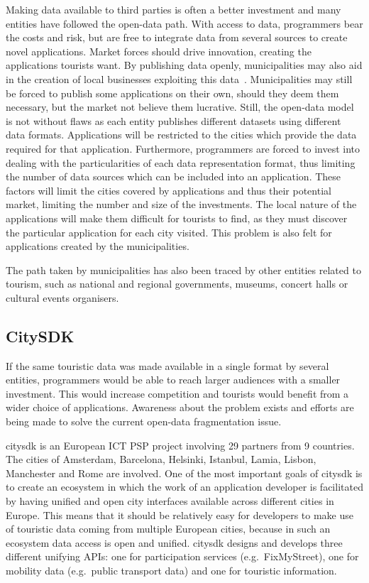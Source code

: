 \documentclass[times,doublespace]{ettauth}%
\begin{document}
Making data available to third parties is often a better investment and many entities have followed the open-data path.
With access to data, programmers bear the costs and risk, but are free to integrate data from several sources to create novel applications.
Market forces should drive innovation, creating the applications tourists want.
By publishing data openly, municipalities may also aid in the creation of local businesses exploiting this data~\cite{6525605}.
Municipalities may still be forced to publish some applications on their own, should they deem them necessary, but the market not believe them lucrative. 
Still, the open-data model is not without flaws as each entity publishes different datasets using different data formats.
Applications will be restricted to the cities which provide the data required for that application.
Furthermore, programmers are forced to invest into dealing with the particularities of each data representation format, thus limiting the number of data sources which can be included into an application.
These factors will limit the cities covered by applications and thus their potential market, limiting the number and size of the investments.
The local nature of the applications will make them difficult for tourists to find, as they must discover the particular application for each city visited.
This problem is also felt for applications created by the municipalities.

The path taken by municipalities has also been traced by other entities related to tourism, such as national and regional governments, museums, concert halls or cultural events organisers.

\subsection{CitySDK}
\label{s:citysdk}

If the same touristic data was made available in a single format by several entities, programmers would be able to reach larger audiences with a smaller investment. 
This would increase competition and tourists would benefit from a wider choice of applications.
Awareness about the problem exists and efforts are being made to solve the current open-data fragmentation issue.

\ac{citysdk} is an European ICT PSP project involving 29 partners from 9 countries.
The cities of Amsterdam, Barcelona, Helsinki, Istanbul, Lamia, Lisbon, Manchester and Rome are involved.
One of the most important goals of \ac{citysdk} is to create an ecosystem in which the work of an application developer is facilitated by having unified and open city interfaces available across different cities in Europe. 
This means that it should be relatively easy for developers to make use of touristic data coming from multiple European cities, because in such an ecosystem data access is open and unified. 
\ac{citysdk} designs and develops three different unifying APIs: one for participation services (e.g.\  FixMyStreet), one for mobility data (e.g.\  public transport data) and one for touristic information. 
 
\end{document}
